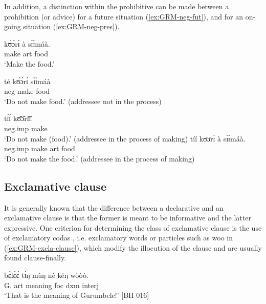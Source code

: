 In addition, a distinction within the prohibitive can be made
between a prohibition (or advice) for a future situation  
(\ref{ex:GRM-neg-fut}), 
and  for an on-going situation (\ref{ex:GRM-neg-pres}). 


\begin{multicols}{2}
 
 

\ea\label{ex:GRM-neg-fut-pres}

 \ea\label{ex:GRM-neg-fut}
\gll  kʊ̀ɔ̀rɪ̀ à sɪ̀ɪ̀máà.\\
  make {\sc art} food\\
 \glt `Make the food.'
 
 
 \ex 
\gll  té kʊ́ɔ́rɪ́ sɪ̀ɪ̀máà\\
{\sc neg}  make food\\
 \glt `Do not make food.' (addressee not in the process)
 \vfill
 \columnbreak
 
  \ex \label{ex:GRM-neg-pres}
  \gll  tɪ́ɪ́ kʊ̄ɔ̄rɪ̄ɪ̄.\\
 {\sc neg.imp}  make\\
 \glt `Do not make (food).' (addressee in the process of making)
   \ex 
  \gll  tíí kʊ̄ɔ̄rɪ̀  à sɪ̀ɪ̀máà.\\
 {\sc neg.imp}  make {\sc art}  food\\
 \glt `Do not make the food.' (addressee in the process of making)
\z
\z

\end{multicols}



\subsection{Exclamative clause}
\label{sec:GRM-excla-clause}

It is generally known that the difference between a declarative and an exclamative  clause is 
that the former is meant to be informative and the latter expressive. One criterion for determining 
the class of exclamative clause is the use of  exclamatory codas  \citep[242]{alla14}, i.e.  
exclamatory words or particles such as  {\sls woo} in (\ref{ex:GRM-excla-clause}), which modify the 
illocution of the clause and are usually found clause-finally.

 \ea\label{ex:GRM-excla-clause}
\ea\label{ex:GRM-excla-clause-1}
\gll  bɛ̀lɛ̀ɛ́ tɪ́ŋ mùŋ nè kéŋ wòòò. \\
G. {\sc art} meaning {\sc foc} {\sc dxm}  {\sc interj}\\
\glt `That is the meaning of Gurumbele!' [BH 016]

